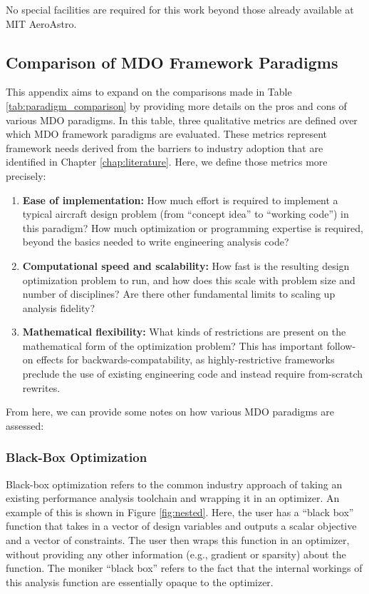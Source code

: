 \documentclass[12pt,vi,oneside,table]{report}
\begin{document}
    No special facilities are required for this work beyond those already available at MIT AeroAstro.

    \begin{appendices}
        \chapter{Comparison of MDO Framework Paradigms}
        \label{chap:paradigm_comparison}

        This appendix aims to expand on the comparisons made in Table \ref{tab:paradigm_comparison} by providing more details on the pros and cons of various MDO paradigms. In this table, three qualitative metrics are defined over which MDO framework paradigms are evaluated. These metrics represent framework needs derived from the barriers to industry adoption that are identified in Chapter \ref{chap:literature}. Here, we define those metrics more precisely:

        \begin{enumerate}
            \item \textbf{Ease of implementation:} How much effort is required to implement a typical aircraft design problem (from ``concept idea'' to ``working code'') in this paradigm? How much optimization or programming expertise is required, beyond the basics needed to write engineering analysis code?
            \item \textbf{Computational speed and scalability:} How fast is the resulting design optimization problem to run, and how does this scale with problem size and number of disciplines? Are there other fundamental limits to scaling up analysis fidelity?
            \item \textbf{Mathematical flexibility:} What kinds of restrictions are present on the mathematical form of the optimization problem? This has important follow-on effects for backwards-compatability, as highly-restrictive frameworks preclude the use of existing engineering code and instead require from-scratch rewrites.
        \end{enumerate}

        From here, we can provide some notes on how various MDO paradigms are assessed:

        \subsection*{Black-Box Optimization}

        Black-box optimization refers to the common industry approach of taking an existing performance analysis toolchain and wrapping it in an optimizer. An example of this is shown in Figure \ref{fig:nested}. Here, the user has a ``black box'' function that takes in a vector of design variables and outputs a scalar objective and a vector of constraints. The user then wraps this function in an optimizer, without providing any other information (e.g., gradient or sparsity) about the function. The moniker ``black box'' refers to the fact that the internal workings of this analysis function are essentially opaque to the optimizer.


\end{appendices}
\end{document}

